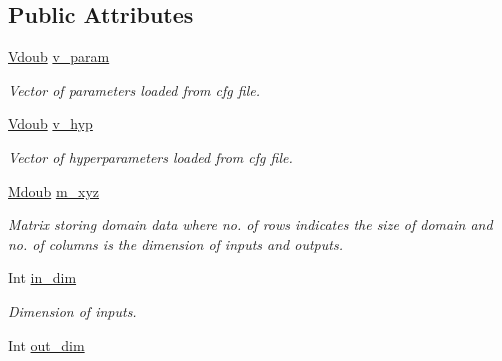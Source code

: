 \subsection*{Public Attributes}
\begin{DoxyCompactItemize}
\item 
\hypertarget{classpgpr__parse_aa2dc5cb24f1a14e11db04e129c070697}{\hyperlink{classpgpr__vector}{Vdoub} \hyperlink{classpgpr__parse_aa2dc5cb24f1a14e11db04e129c070697}{v\-\_\-param}}\label{classpgpr__parse_aa2dc5cb24f1a14e11db04e129c070697}

\begin{DoxyCompactList}\small\item\em Vector of parameters loaded from cfg file. \end{DoxyCompactList}\item 
\hypertarget{classpgpr__parse_afca0013fbaf5205abef333d22f0bcdf4}{\hyperlink{classpgpr__vector}{Vdoub} \hyperlink{classpgpr__parse_afca0013fbaf5205abef333d22f0bcdf4}{v\-\_\-hyp}}\label{classpgpr__parse_afca0013fbaf5205abef333d22f0bcdf4}

\begin{DoxyCompactList}\small\item\em Vector of hyperparameters loaded from cfg file. \end{DoxyCompactList}\item 
\hypertarget{classpgpr__parse_ad68cc51bfd6c7c8193039f51b641e01d}{\hyperlink{classpgpr__matrix}{Mdoub} \hyperlink{classpgpr__parse_ad68cc51bfd6c7c8193039f51b641e01d}{m\-\_\-xyz}}\label{classpgpr__parse_ad68cc51bfd6c7c8193039f51b641e01d}

\begin{DoxyCompactList}\small\item\em Matrix storing domain data where no. of rows indicates the size of domain and no. of columns is the dimension of inputs and outputs. \end{DoxyCompactList}\item 
\hypertarget{classpgpr__parse_a24a21542be9a07d290aed66f90997031}{Int \hyperlink{classpgpr__parse_a24a21542be9a07d290aed66f90997031}{in\-\_\-dim}}\label{classpgpr__parse_a24a21542be9a07d290aed66f90997031}

\begin{DoxyCompactList}\small\item\em Dimension of inputs. \end{DoxyCompactList}\item 
\hypertarget{classpgpr__parse_ae1fab280bf9c33d950d41f3c962fe8f0}{Int \hyperlink{classpgpr__parse_ae1fab280bf9c33d950d41f3c962fe8f0}{out\-\_\-dim}}\label{classpgpr__parse_ae1fab280bf9c33d950d41f3c962fe8f0}


\end{DoxyCompactItemize}

